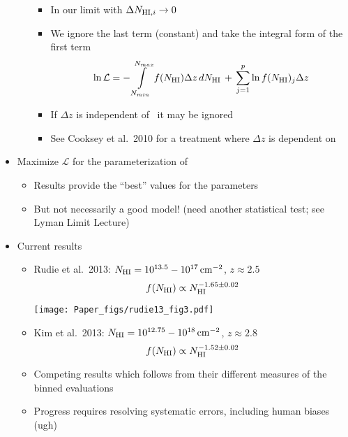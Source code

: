 \documentclass[12pt,letterpaper]{article}
\begin{document}
\begin{Aenumerate}
\begin{itemize}
\begin{itemize}
			\begin{itemize}
			\item In our limit with $\Delta N_{{\rm HI},i} \to 0$
			\item We ignore the last term (constant) and take the integral form
			of the first term
			\begin{equation}
		\ln \mathcal{L} = - \int\limits_{N_{min}}^{N_{max}} f(N_{\rm HI}) \Delta z \, dN_{\rm HI} 
		   \, + \, \sum\limits_{j=1}^p \ln f(N_{\rm HI})_j \Delta z
			\end{equation}
			\item If $\Delta z$ is independent of \nhi\ it may be ignored 
			\item See Cooksey et al.\ 2010 for a treatment where
			$\Delta z$ is dependent on \nhi
			\end{itemize}
		\end{itemize}
		\item Maximize $\mathcal{L}$ for the parameterization of \fnhi
			\begin{itemize}
			\item Results provide the ``best'' values for the parameters
			\item But not necessarily a good model!  (need another statistical
			test; see Lyman Limit Lecture)
			\end{itemize}
		\item Current results 
			\begin{itemize}
			\item Rudie et al.\ 2013: $N_{\rm HI} = 10^{13.5} - 10^{17} \, {\rm cm^{-2}}$, 
			$z \approx 2.5$
			\begin{equation}
			f(N_{\rm HI}) \propto N_{\rm HI}^{-1.65 \pm 0.02}
			\end{equation}

	\texttt{[image: Paper\_figs/rudie13\_fig3.pdf]}

			\item Kim et al.\ 2013: $N_{\rm HI} = 10^{12.75} - 10^{18} \, {\rm cm^{-2}}$,
			$z \approx 2.8$
			\begin{equation}
			f(N_{\rm HI}) \propto N_{\rm HI}^{-1.52 \pm 0.02}
			\end{equation}
			\item Competing results which follows from their different 
			measures of the binned evaluations
			\item Progress requires resolving systematic errors, including
			human biases (ugh)
			\end{itemize}



\end{itemize}
\end{Aenumerate}
\end{document}
